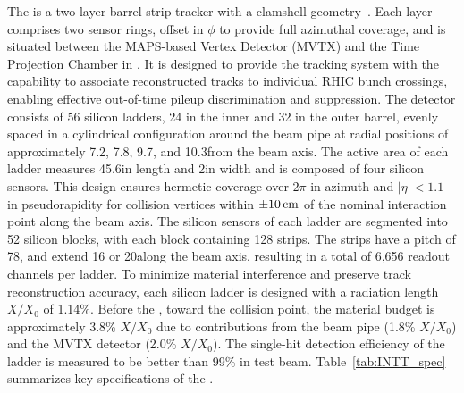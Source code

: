 The \intt is a two-layer barrel strip tracker with a clamshell geometry~\cite{INTT_ladder_NIM_cite}. Each layer comprises two sensor rings, offset in $\phi$ to provide full azimuthal coverage, and is situated between the MAPS-based Vertex Detector (MVTX) and the Time Projection Chamber in \sphenix.
It is designed to provide the \sphenix tracking system with the capability to associate reconstructed tracks to individual RHIC bunch crossings, enabling effective out-of-time pileup discrimination and suppression. 
The detector consists of 56 silicon ladders, 24 in the inner and 32 in the outer barrel, evenly spaced in a cylindrical configuration around the beam pipe at radial positions of approximately 7.2, 7.8, 9.7, and 10.3\cm from the beam axis. The active area of each ladder measures 45.6\cm in length and 2\cm in width and is composed of four silicon sensors. This design ensures hermetic coverage over $2\pi$ in azimuth and $|\eta|<1.1$ in pseudorapidity for collision vertices within $\pm10\rm \,cm$ of the nominal interaction point along the beam axis. The silicon sensors of each ladder are segmented into 52 silicon blocks, with each block containing 128 strips. The strips have a pitch of 78\mum, and extend 16 or 20\mm along the beam axis, resulting in a total of 6,656 readout channels per ladder. To minimize material interference and preserve track reconstruction accuracy, each silicon ladder is designed with a radiation length \ensuremath{X/X_0} of 1.14\%. Before the \intt, toward the collision point, the material budget is approximately 3.8\% \ensuremath{X/X_0} due to contributions from the beam pipe (1.8\% \ensuremath{X/X_0}) and the MVTX detector (2.0\% \ensuremath{X/X_0}). The single-hit detection efficiency of the \intt ladder is measured to be better than 99\% in test beam. Table~\ref{tab:INTT_spec} summarizes key specifications of the \intt.


